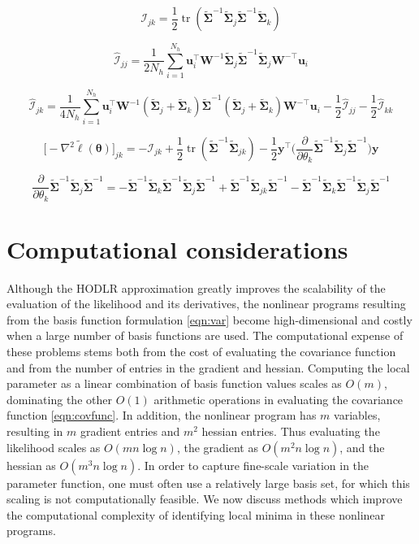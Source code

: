 \documentclass{article}
\newcommand{\I}{\mathcal{I}}
\DeclareMathOperator{\tr}{tr}
\numberwithin{equation}{section}
\newcommand{\cm}{\bm{\Sigma}}
\newcommand{\acm}{\widetilde{\cm}}
\newcommand{\y}{\bm{y}}
\renewcommand{\u}{\bm{u}}
\newcommand{\W}{\bm{W}}
\begin{document}
\begin{equation}
  \I_{jk} = \frac{1}{2} \tr(\acm^{-1} \acm_j \acm^{-1} \acm_k)
  \label{eqn:fish}
\end{equation}

\begin{equation}
  \widehat{\I}_{jj} = \frac{1}{2N_h} \sum_{i=1}^{N_h} \u_i^\top \W^{-1} \acm_j \acm^{-1} \acm_j \W^{-\top} \u_i
  \label{eqn:approxfishdiag}
\end{equation}

\begin{equation}
  \widehat{\I}_{jk} = \frac{1}{4N_h} \sum_{i=1}^{N_h} \u_i^\top \W^{-1} (\acm_j + \acm_k) \acm^{-1} (\acm_j + \acm_k) \W^{-\top} \u_i - \frac{1}{2} \widehat{\I}_{jj} - \frac{1}{2} \widehat{\I}_{kk}
  \label{eqn:approxfish}
\end{equation}

\begin{equation}
  \big[-\nabla^2 \tilde{\ell}(\bm{\theta})\big]_{jk} = -\I_{jk} + \frac{1}{2} \tr(\acm^{-1} \acm_{jk}) - \frac{1}{2} \y^\top \Big( \frac{\partial}{\partial \theta_k} \acm^{-1} \acm_j \acm^{-1} \Big) \y
  \label{eqn:approxhess}
\end{equation}

\begin{equation}
  \frac{\partial}{\partial \theta_k} \acm^{-1} \acm_j \acm^{-1} = - \acm^{-1} \acm_k \acm^{-1} \acm_j \acm^{-1} + \acm^{-1} \acm_{jk} \acm^{-1} - \acm^{-1} \acm_k \acm^{-1} \acm_j \acm^{-1}
  \label{eqn:derexp}
\end{equation}


\section{Computational considerations} \label{sec:computation}
Although the HODLR approximation greatly improves the scalability of the evaluation of the likelihood and its derivatives, the nonlinear programs resulting from the basis function formulation \ref{eqn:var} become high-dimensional and costly when a large number of basis functions are used. The computational expense of these problems stems both from the cost of evaluating the covariance function and from the number of entries in the gradient and hessian. Computing the local parameter as a linear combination of basis function values scales as $O(m)$, dominating the other $O(1)$ arithmetic operations in evaluating the covariance function \ref{eqn:covfunc}. In addition, the nonlinear program has $m$ variables, resulting in $m$ gradient entries and $m^2$ hessian entries. Thus evaluating the likelihood scales as $O(m n\log n)$, the gradient as $O(m^2 n\log n)$, and the hessian as $O(m^3 n\log n)$. In order to capture fine-scale variation in the parameter function, one must often use a relatively large basis set, for which this scaling is not computationally feasible. We now discuss methods which improve the computational complexity of identifying local minima in these nonlinear programs.
\end{document}
